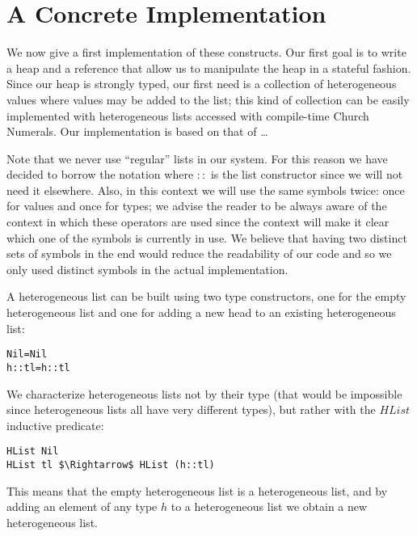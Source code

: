 \documentclass[a4paper]{article}
\begin{document}

\noindent 
\section{A Concrete Implementation}

\noindent We now give a first implementation of these constructs. Our first goal is to write a heap and a reference that allow us to manipulate the heap in a stateful fashion. Since our heap is strongly typed, our first need is a collection of heterogeneous values where values may be added to the list; this kind of collection can be easily implemented with heterogeneous lists accessed with compile-time Church Numerals. Our implementation is based on that of \dots 

\noindent Note that we never use ``regular'' lists in our system. For this reason we have decided to borrow the notation where $::$ is the list constructor since we will not need it elsewhere. Also, in this context we will use the same symbols twice: once for values and once for types; we advise the reader to be always aware of the context in which these operators are used since the context will make it clear which one of the symbols is currently in use. We believe that having two distinct sets of symbols in the end would reduce the readability of our code and so we only used distinct symbols in the actual implementation.

\noindent A heterogeneous list can be built using two type constructors, one for the empty heterogeneous list and one for adding a new head to an existing heterogeneous list:

\begin{lstlisting}
Nil=Nil
h::tl=h::tl
\end{lstlisting}

We characterize heterogeneous lists not by their type (that would be impossible since heterogeneous lists all have very different types), but rather with the $HList $inductive predicate:

\begin{lstlisting}
HList Nil
HList tl $\Rightarrow$ HList (h::tl)
\end{lstlisting}

This means that the empty heterogeneous list is a heterogeneous list, and by adding an element of any type $h$ to a heterogeneous list we obtain a new heterogeneous list.
\end{document}
